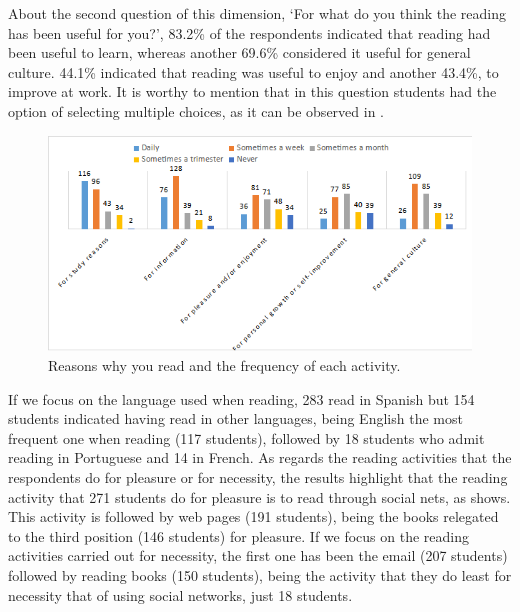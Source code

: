 \documentclass[english]{textolivre}
\begin{document}
About the second question of this dimension, ‘For what do you think the reading has been useful for you?’, 83.2\% of the respondents indicated that reading had been useful to learn, whereas another 69.6\% considered it useful for general culture. 44.1\% indicated that reading was useful to enjoy and another 43.4\%, to improve at work. It is worthy to mention that in this question students had the option of selecting multiple choices, as it can be observed in .


\begin{figure}[htbp]
\centering
\begin{minipage}{.85\textwidth}
 \includegraphics[width=\textwidth]{Imagem2.png}
 \caption{Reasons why you read and the frequency of each activity.}
 \label{fig02}
\end{minipage}
\end{figure}

If we focus on the language used when reading, 283 read in Spanish but 154 students indicated having read in other languages, being English the most frequent one when reading (117 students), followed by 18 students who admit reading in Portuguese and 14 in French. As regards the reading activities that the respondents do for pleasure or for necessity, the results highlight that the reading activity that 271 students do for pleasure is to read through social nets, as  shows. This activity is followed by web pages (191 students), being the books relegated to the third position (146 students) for pleasure. If we focus on the reading activities carried out for necessity, the first one has been the email (207 students) followed by reading books (150 students), being the activity that they do least for necessity that of using social networks, just 18 students.
\end{document}
